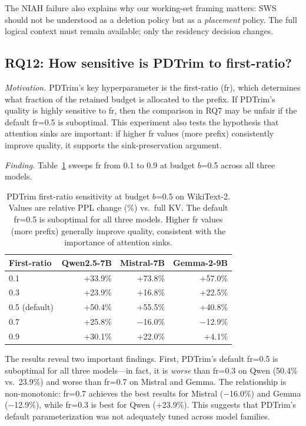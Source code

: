 \documentclass[11pt]{article}
\newcommand{\sws}{SWS}
\newcommand{\pct}{\%}
\theoremstyle{definition}
\theoremstyle{plain}
\begin{document}
The NIAH failure also explains why our working-set framing matters: \sws{} should not be understood as a deletion policy but as a \emph{placement} policy.  The full logical context must remain available; only the residency decision changes.

\subsection{RQ12: How sensitive is PDTrim to first-ratio?}
\label{sec:rq12}

\emph{Motivation.}  PDTrim's key hyperparameter is the first-ratio (fr), which determines what fraction of the retained budget is allocated to the prefix.  If PDTrim's quality is highly sensitive to fr, then the comparison in RQ7 may be unfair if the default fr=0.5 is suboptimal.  This experiment also tests the hypothesis that attention sinks are important: if higher fr values (more prefix) consistently improve quality, it supports the sink-preservation argument.

\emph{Finding.}  Table~\ref{tab:fr-scan} sweeps fr from 0.1 to 0.9 at budget $b$=0.5 across all three models.

\begin{table}[t]
\centering
\caption{PDTrim first-ratio sensitivity at budget $b$=0.5 on WikiText-2.  Values are relative PPL change (\%) vs.\ full KV.  The default fr=0.5 is suboptimal for all three models.  Higher fr values (more prefix) generally improve quality, consistent with the importance of attention sinks.}
\label{tab:fr-scan}
\small
\begin{tabular}{lrrr}
\toprule
First-ratio & Qwen2.5-7B & Mistral-7B & Gemma-2-9B \\
\midrule
0.1 & +33.9\pct{} & +73.8\pct{} & +57.0\pct{} \\
0.3 & +23.9\pct{} & +16.8\pct{} & +22.5\pct{} \\
0.5 (default) & +50.4\pct{} & +55.5\pct{} & +40.8\pct{} \\
0.7 & +25.8\pct{} & $-$16.0\pct{} & $-$12.9\pct{} \\
0.9 & +30.1\pct{} & +22.0\pct{} & +4.1\pct{} \\
\bottomrule
\end{tabular}
\end{table}

The results reveal two important findings.  First, PDTrim's default fr=0.5 is suboptimal for all three models---in fact, it is \emph{worse} than fr=0.3 on Qwen (50.4\pct{} vs.\ 23.9\pct{}) and worse than fr=0.7 on Mistral and Gemma.  The relationship is non-monotonic: fr=0.7 achieves the best results for Mistral ($-$16.0\pct{}) and Gemma ($-$12.9\pct{}), while fr=0.3 is best for Qwen (+23.9\pct{}).  This suggests that PDTrim's default parameterization was not adequately tuned across model families.
\end{document}
